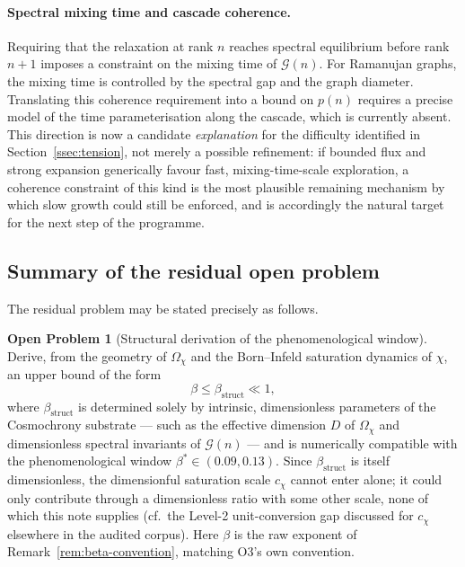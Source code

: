 \documentclass[11pt,a4paper]{article}
\theoremstyle{definition}
\newtheorem{openproblem}[theorem]{Open Problem}
\theoremstyle{remark}
\begin{document}
    \paragraph{Spectral mixing time and cascade coherence.}
      Requiring that the relaxation at rank $n$ reaches spectral equilibrium before rank $n+1$
      imposes a constraint on the mixing time of $\mathcal{G}(n)$.
      For Ramanujan graphs, the mixing time is controlled by the spectral gap and the graph
      diameter.
      Translating this coherence requirement into a bound on $p(n)$ requires a precise model of
      the time parameterisation along the cascade, which is currently absent.
      This direction is now a candidate \emph{explanation} for the difficulty identified in
      Section~\ref{ssec:tension}, not merely a possible refinement: if bounded flux and strong
      expansion generically favour fast, mixing-time-scale exploration, a coherence constraint
      of this kind is the most plausible remaining mechanism by which slow growth could still
      be enforced, and is accordingly the natural target for the next step of the programme.

  \subsection{Summary of the residual open problem}
  \label{ssec:open-problem}

  The residual problem may be stated precisely as follows.

  \begin{openproblem}[Structural derivation of the phenomenological window]
    \label{op:beta-window}
    Derive, from the geometry of $\Omega_\chi$ and the Born--Infeld saturation dynamics of
    $\chi$, an upper bound of the form
    \begin{equation}
      \beta \leq \beta_{\mathrm{struct}} \ll 1,
    \end{equation}
    where $\beta_{\mathrm{struct}}$ is determined solely by intrinsic, dimensionless
    parameters of the Cosmochrony substrate --- such as the effective dimension $D$ of
    $\Omega_\chi$ and dimensionless spectral invariants of $\mathcal{G}(n)$ --- and is
    numerically compatible with the phenomenological window $\beta^* \in (0.09, 0.13)$.
    Since $\beta_{\mathrm{struct}}$ is itself dimensionless, the dimensionful saturation scale
    $c_\chi$ cannot enter alone; it could only contribute through a dimensionless ratio with
    some other scale, none of which this note supplies (cf.\ the Level-2 unit-conversion gap
    discussed for $c_\chi$ elsewhere in the audited corpus).
    Here $\beta$ is the raw exponent of Remark~\ref{rem:beta-convention}, matching O3's own
    convention.
  \end{openproblem}
\end{document}
